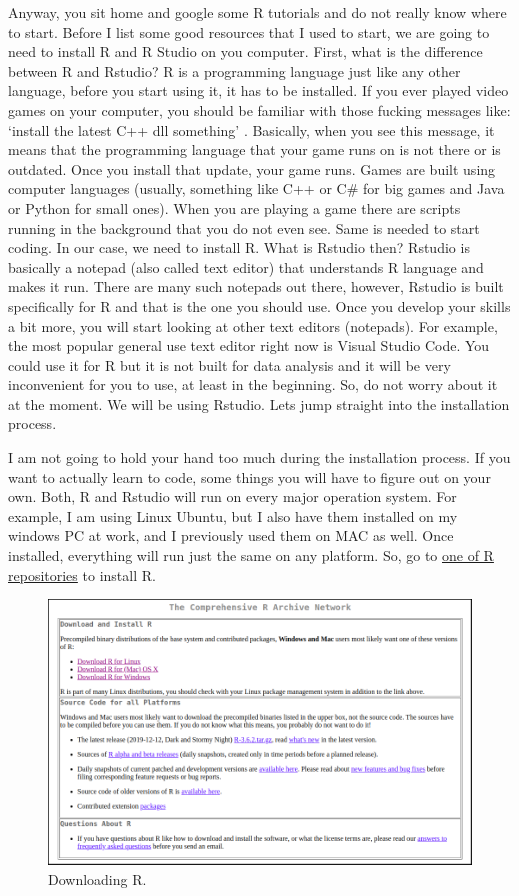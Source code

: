 \documentclass[]{book}
\begin{document}
Anyway, you sit home and google some R tutorials and do not really know where to start. Before I list some good resources that I used to start, we are going to need to install R and R Studio on you computer. First, what is the difference between R and Rstudio? R is a programming language just like any other language, before you start using it, it has to be installed. If you ever played video games on your computer, you should be familiar with those fucking messages like: `install the latest C++ dll something' . Basically, when you see this message, it means that the programming language that your game runs on is not there or is outdated. Once you install that update, your game runs. Games are built using computer languages (usually, something like C++ or C\# for big games and Java or Python for small ones). When you are playing a game there are scripts running in the background that you do not even see. Same is needed to start coding. In our case, we need to install R. What is Rstudio then? Rstudio is basically a notepad (also called text editor) that understands R language and makes it run. There are many such notepads out there, however, Rstudio is built specifically for R and that is the one you should use. Once you develop your skills a bit more, you will start looking at other text editors (notepads). For example, the most popular general use text editor right now is Visual Studio Code. You could use it for R but it is not built for data analysis and it will be very inconvenient for you to use, at least in the beginning. So, do not worry about it at the moment. We will be using Rstudio. Lets jump straight into the installation process.

I am not going to hold your hand too much during the installation process. If you want to actually learn to code, some things you will have to figure out on your own. Both, R and Rstudio will run on every major operation system. For example, I am using Linux Ubuntu, but I also have them installed on my windows PC at work, and I previously used them on MAC as well. Once installed, everything will run just the same on any platform. So, go to \href{https://mirror.las.iastate.edu/CRAN/}{one of R repositories} to install R.

\begin{figure}
\centering
\includegraphics{rInstaller.png}
\caption{Downloading R.}
\end{figure}
\end{document}

